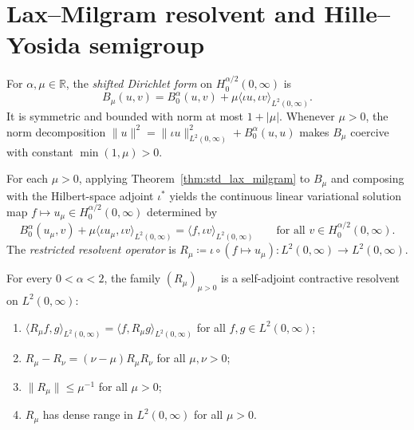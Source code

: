 \section{Lax--Milgram resolvent and Hille--Yosida semigroup}

\begin{definition}\label{def:restricted_shifted_form}
\leanok
For $\alpha, \mu \in \mathbb{R}$, the \emph{shifted Dirichlet form} on $H^{\alpha/2}_0(0,\infty)$ is
\[
  B_\mu(u, v) = B^\alpha_0(u, v) + \mu \langle \iota u, \iota v \rangle_{L^2(0,\infty)}.
\]
It is symmetric and bounded with norm at most $1 + \lvert \mu \rvert$. Whenever $\mu > 0$, the norm decomposition $\lVert u \rVert^2 = \lVert \iota u \rVert_{L^2(0,\infty)}^2 + B^\alpha_0(u, u)$ makes $B_\mu$ coercive with constant $\min(1, \mu) > 0$.
\end{definition}

\begin{definition}\label{def:restricted_resolvent_op}
\leanok
For each $\mu > 0$, applying Theorem~\ref{thm:std_lax_milgram} to $B_\mu$ and composing with the Hilbert-space adjoint $\iota^*$ yields the continuous linear variational solution map $f \mapsto u_\mu \in H^{\alpha/2}_0(0,\infty)$ determined by
\[
  B^\alpha_0(u_\mu, v) + \mu \langle \iota u_\mu, \iota v \rangle_{L^2(0,\infty)} = \langle f, \iota v \rangle_{L^2(0,\infty)} \qquad \text{for all } v \in H^{\alpha/2}_0(0,\infty).
\]
The \emph{restricted resolvent operator} is $R_\mu \coloneqq \iota \circ (f \mapsto u_\mu) : L^2(0,\infty) \to L^2(0,\infty)$.
\end{definition}

\begin{theorem}\label{thm:restricted_frac_lap_resolvent}
\leanok
For every $0 < \alpha < 2$, the family $(R_\mu)_{\mu > 0}$ is a self-adjoint contractive resolvent on $L^2(0,\infty)$:
\begin{enumerate}
\item $\langle R_\mu f, g \rangle_{L^2(0,\infty)} = \langle f, R_\mu g \rangle_{L^2(0,\infty)}$ for all $f, g \in L^2(0,\infty)$;
\item $R_\mu - R_\nu = (\nu - \mu) R_\mu R_\nu$ for all $\mu, \nu > 0$;
\item $\lVert R_\mu \rVert \le \mu^{-1}$ for all $\mu > 0$;
\item $R_\mu$ has dense range in $L^2(0,\infty)$ for all $\mu > 0$.
\end{enumerate}
\end{theorem}

